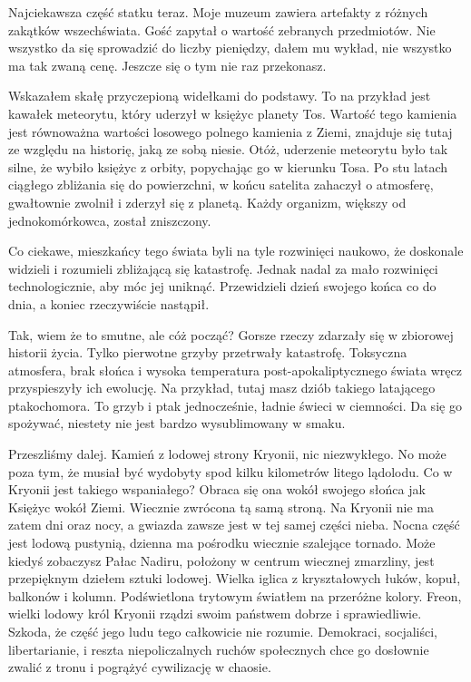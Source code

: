 Najciekawsza część statku teraz.
Moje muzeum zawiera artefakty z różnych zakątków wszechświata. Gość zapytał o wartość zebranych przedmiotów.
Nie wszystko da się sprowadzić do liczby pieniędzy, dałem mu wykład, nie wszystko ma tak zwaną cenę. 
Jeszcze się o tym nie raz przekonasz.

Wskazałem skałę przyczepioną widełkami do podstawy. 
To na przykład jest kawałek meteorytu, który uderzył w księżyc planety Tos. Wartość tego kamienia jest równoważna wartości losowego polnego kamienia z Ziemi, 
znajduje się tutaj ze względu na historię, jaką ze sobą niesie.
Otóż, uderzenie meteorytu było tak silne, że wybiło księżyc z orbity, popychając go w kierunku Tosa.
Po stu latach ciągłego zbliżania się do powierzchni, w końcu satelita zahaczył o atmosferę, gwałtownie zwolnił i zderzył się z planetą.
Każdy organizm, większy od jednokomórkowca, został zniszczony.

Co ciekawe, mieszkańcy tego świata byli na tyle rozwinięci naukowo, że doskonale widzieli i rozumieli zbliżającą się katastrofę.
Jednak nadal za mało rozwinięci technologicznie, aby móc jej uniknąć.
Przewidzieli dzień swojego końca co do dnia, a koniec rzeczywiście nastąpił.

Tak, wiem że to smutne, ale cóż począć? Gorsze rzeczy zdarzały się w zbiorowej historii życia. 
Tylko pierwotne grzyby przetrwały katastrofę.
Toksyczna atmosfera, brak słońca i wysoka temperatura post-apokaliptycznego świata wręcz przyspieszyły ich ewolucję.
Na przykład, tutaj masz dziób takiego latającego ptakochomora. To grzyb i ptak jednocześnie, ładnie świeci w ciemności.
Da się go spożywać, niestety nie jest bardzo wysublimowany w smaku.

Przeszliśmy dalej. Kamień z lodowej strony Kryonii, nic niezwykłego. 
No może poza tym, że musiał być wydobyty spod kilku kilometrów litego lądolodu.
Co w Kryonii jest takiego wspaniałego? Obraca się ona wokół swojego słońca jak Księżyc wokół Ziemi. 
Wiecznie zwrócona tą samą stroną.
Na Kryonii nie ma zatem dni oraz nocy, a gwiazda zawsze jest w tej samej części nieba.
Nocna część jest lodową pustynią, dzienna ma pośrodku wiecznie szalejące tornado.
Może kiedyś zobaczysz Pałac Nadiru, położony w centrum wiecznej zmarzliny, jest przepięknym dziełem sztuki lodowej.
Wielka iglica z kryształowych łuków, kopuł, balkonów i kolumn.
Podświetlona trytowym światłem na przeróżne kolory.
Freon, wielki lodowy król Kryonii rządzi swoim państwem dobrze i sprawiedliwie.
Szkoda, że część jego ludu tego całkowicie nie rozumie. 
Demokraci, socjaliści, libertarianie, i reszta niepoliczalnych ruchów społecznych chce go dosłownie zwalić z tronu i pogrążyć cywilizację w chaosie.

